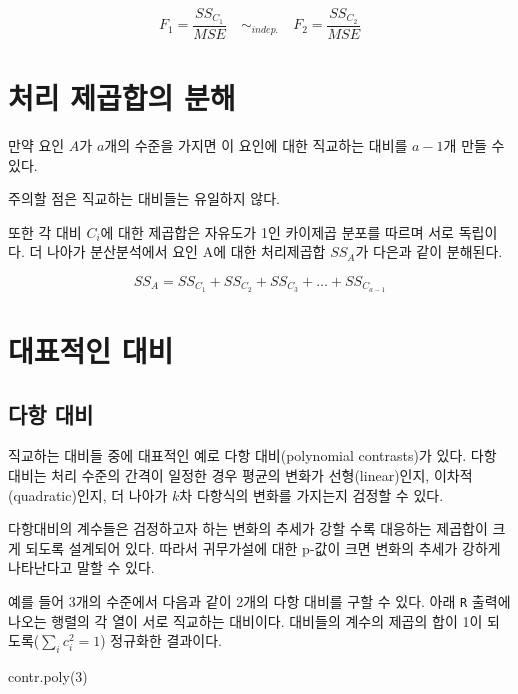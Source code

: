 \documentclass[
]{book}
\newenvironment{Shaded}{\begin{snugshade}}{\end{snugshade}}
\newcommand{\DecValTok}[1]{\textcolor[rgb]{0.00,0.00,0.81}{#1}}
\newcommand{\FunctionTok}[1]{\textcolor[rgb]{0.00,0.00,0.00}{#1}}
\newcommand{\NormalTok}[1]{#1}
\begin{document}
\[ F_1 = \frac{SS_{C_1}}{MSE}  \quad \sim_{indep.} \quad F_2 = \frac{SS_{C_2}}{MSE} \]

\hypertarget{uxcc98uxb9ac-uxc81cuxacf1uxd569uxc758-uxbd84uxd574}{%
\section{처리 제곱합의 분해}\label{uxcc98uxb9ac-uxc81cuxacf1uxd569uxc758-uxbd84uxd574}}

만약 요인 \(A\)가 \(a\)개의 수준을 가지면 이 요인에 대한 직교하는 대비를 \(a-1\)개 만들 수 있다.

주의할 점은 직교하는 대비들는 유일하지 않다.

또한 각 대비 \(C_{i}\)에 대한 제곱합은 자유도가 1인 카이제곱 분포를 따르며 서로 독립이다. 더 나아가
분산분석에서 요인 A에 대한 처리제곱합 \(SS_A\)가 다은과 같이 분해된다.

\[ SS_A = SS_{C_1}  + SS_{C_2} + SS_{C_3} + \dots + SS_{C_{a-1}} \]

\hypertarget{uxb300uxd45cuxc801uxc778-uxb300uxbe44}{%
\section{대표적인 대비}\label{uxb300uxd45cuxc801uxc778-uxb300uxbe44}}

\hypertarget{uxb2e4uxd56d-uxb300uxbe44}{%
\subsection{다항 대비}\label{uxb2e4uxd56d-uxb300uxbe44}}

직교하는 대비들 중에 대표적인 예로 다항 대비(polynomial contrasts)가 있다. 다항 대비는 처리 수준의 간격이 일정한 경우 평균의 변화가 선형(linear)인지, 이차적(quadratic)인지, 더 나아가 \(k\)차 다항식의 변화를 가지는지 검정할 수 있다.

다항대비의 계수들은 검정하고자 하는 변화의 추세가 강할 수록 대응하는 제곱합이 크게 되도록 설계되어 있다.
따라서 귀무가설에 대한 p-값이 크면 변화의 추세가 강하게 나타난다고 말할 수 있다.

예를 들어 3개의 수준에서 다음과 같이 2개의 다항 대비를 구할 수 있다. 아래 \texttt{R} 출력에 나오는 행렬의 각 열이 서로 직교하는 대비이다. 대비들의 계수의 제곱의 합이 1이 되도록(\(\sum_i c_i^2=1\)) 정규화한 결과이다.

\begin{Shaded}
\begin{Highlighting}[]
\FunctionTok{contr.poly}\NormalTok{(}\DecValTok{3}\NormalTok{)}
\end{Highlighting}
\end{Shaded}
\end{document}
